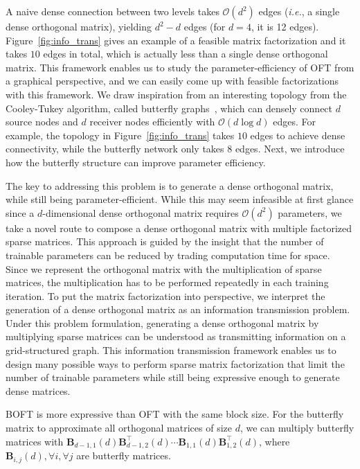 A naive dense connection between two levels takes $\mathcal{O}(d^2)$ edges (\emph{i.e.}, a single dense orthogonal matrix), yielding $d^2-d$ edges (for $d=4$, it is 12 edges). Figure~\ref{fig:info_trans} gives an example of a feasible matrix factorization and it takes $10$ edges in total, which is actually less than a single dense orthogonal matrix. This framework enables us to study the parameter-efficiency of OFT from a graphical perspective, and we can easily come up with feasible factorizations with this framework. We draw inspiration from an interesting topology from the Cooley-Tukey algorithm, called butterfly graphs~\cite{cooley1965algorithm}, which can densely connect $d$ source nodes and $d$ receiver nodes efficiently with $\mathcal{O}(d\log d)$ edges. For example, the topology in Figure~\ref{fig:info_trans} takes $10$ edges to achieve dense connectivity, while the butterfly network only takes $8$ edges. Next, we introduce how the butterfly structure can improve parameter efficiency.

The key to addressing this problem is to generate a dense orthogonal matrix, while still being parameter-efficient. While this may seem infeasible at first glance since a $d$-dimensional dense orthogonal matrix requires $\mathcal{O}(d^2)$ parameters, we take a novel route to compose a dense orthogonal matrix with multiple factorized sparse matrices. This approach is guided by the insight that the number of trainable parameters can be reduced by trading computation time for space. Since we represent the orthogonal matrix with the multiplication of sparse matrices, the multiplication has to be performed repeatedly in each training iteration. To put the matrix factorization into perspective, we interpret the generation of a dense orthogonal matrix as an information transmission problem. Under this problem formulation, generating a dense orthogonal matrix by multiplying sparse matrices can be understood as transmitting information on a grid-structured graph. This information transmission framework enables us to design many possible ways to perform sparse matrix factorization that limit the number of trainable parameters while still being expressive enough to generate dense matrices.

\begin{theorem}\label{thm:exp_boft}
    BOFT is more expressive than OFT with the same block size. For the butterfly matrix to approximate all orthogonal matrices of size $d$, we can multiply butterfly matrices with  $\bm{B}_{d-1,1}(d)\bm{B}^\top_{d-1,2}(d)\cdots\bm{B}_{1,1}(d)\bm{B}^\top_{1,2}(d)$, where $\bm{B}_{i,j}(d),\forall i,\forall j$ are butterfly matrices.
\end{theorem}

